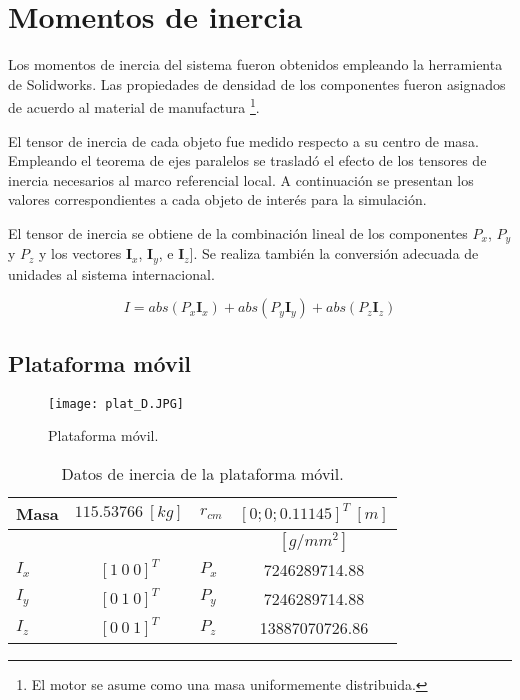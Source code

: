 \section{Momentos de inercia}
\label{sec: inertia}

Los momentos de inercia del sistema fueron obtenidos
empleando la herramienta de Solidworks. 
Las propiedades de densidad de los componentes 
fueron asignados de acuerdo al material de manufactura
\footnote{El motor se asume como una masa uniformemente distribuida.}.

El tensor de inercia de cada objeto fue medido respecto a su centro de masa.
Empleando el teorema de ejes paralelos 
\cite{olguin20183d}
se trasladó el efecto de los tensores de inercia necesarios al marco referencial local.
A continuación se presentan los valores correspondientes a cada objeto de interés para la simulación.

El tensor de inercia se obtiene de la combinación lineal 
de los componentes $P_x$, $P_y$ y $P_z$ y los vectores $\mathbf I_x$, $\mathbf I_y$, e $\mathbf I_z]$.
Se realiza también la conversión adecuada de unidades al
sistema internacional.

\begin{equation*}
 I = abs(P_x \mathbf I_x) + abs(P_y \mathbf I_y) +abs(P_z \mathbf I_z)
\end{equation*}

\subsection{Plataforma móvil}

\begin{figure}[htb!]
    \centering
    \texttt{[image: plat\_D.JPG]}
    \caption{Plataforma móvil.}
    \label{fig: cad platform}
\end{figure}

\begin{table}[hb!]
 \begin{center}
\begin{tabular}{lclc}
 Masa & $  115.53766 \ [kg]$ & $r_{cm}$ &  $[0; 0; 0.11145]^T \ [m]$ \\
 \hline
 & & & $[g/mm^2]$\\
 \hline
 $ I_x $ & $ [1 \ 0 \ 0]^T $ & $ P_x $ & 7246289714.88\\
 $ I_y $ & $ [0 \ 1 \ 0]^T $ & $ P_y $ & 7246289714.88\\
 $ I_z $ & $ [0 \ 0 \ 1]^T $ & $ P_z $ & 13887070726.86
\end{tabular}
\end{center}
\caption{Datos de inercia de la plataforma móvil.}
\label{tab: inertia table platform}
\end{table}


